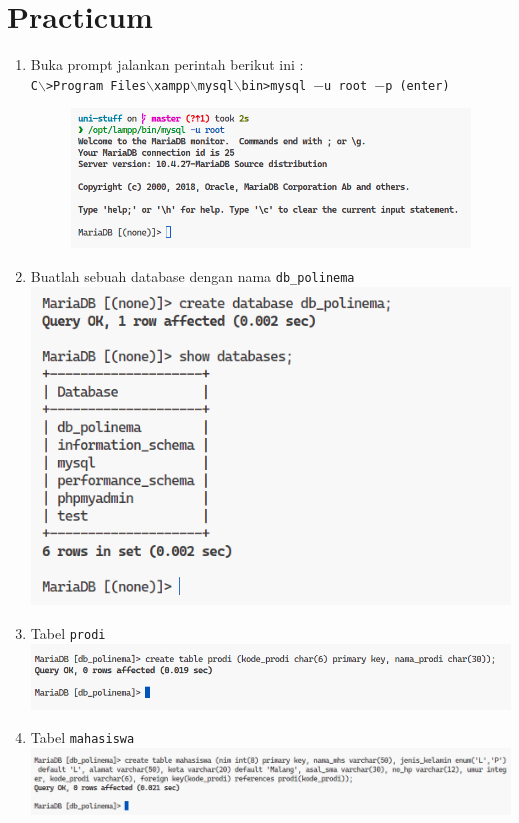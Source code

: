 \documentclass[12pt,titlepage]{article}
\begin{document}
\section{Practicum}
\begin{enumerate}
    \item {
        Buka prompt jalankan perintah berikut ini :\\
        \texttt{C$\backslash$>Program Files$\backslash$xampp$\backslash$mysql$\backslash$bin>mysql $-$u root $-$p (enter)}
        \begin{figure}[h]
            \includegraphics[width=.8\textwidth]{./images/practicum-1.png}
        \end{figure}
    }
    \item {
        Buatlah sebuah database dengan nama \texttt{db\_polinema}\\
        \includegraphics[width=.8\textwidth]{./images/practicum-2.png}
    }
    \item {
        Tabel \texttt{prodi}\\
        \includegraphics[width=.8\textwidth]{./images/practicum-3.png}
    }
    \item {
        Tabel \texttt{mahasiswa}\\
        \includegraphics[width=.8\textwidth]{./images/practicum-4.png}
}
\end{enumerate}
\end{document}
